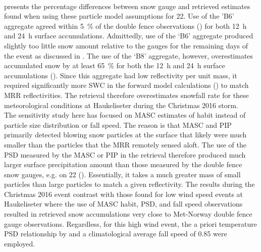 \\
 presents the percentage differences between snow gauge and retrieved estimates found when using these particle model assumptions for \SI{22}{\dec}. Use of the 'B6' aggregate agreed within \SI{5}{\percent} of the double fence observations () for both \SI{12}{\hour} and \SI{24}{\hour} surface accumulations. Admittedly, use of the ‘B6’ aggregate produced slightly too little snow amount relative to the gauges for the remaining days of the event as discussed in . The use of the ‘B8’ aggregate, however, overestimates accumulated snow by at least \SI{65}{\percent} for both the \SI{12}{\hour} and \SI{24}{\hour} surface accumulations (). Since this aggregate had low reflectivity per unit mass, it required significantly more SWC in the forward model calculations () to match MRR reflectivities. The retrieval therefore overestimates snowfall rate for these meteorological conditions at Haukeliseter during the Christmas 2016 storm.
\\
The sensitivity study here has focused on MASC estimates of habit instead of particle size distribution or fall speed. The reason is that MASC and PIP primarily detected blowing snow particles at the surface that likely were much smaller than the particles that the MRR remotely sensed aloft. The use of the PSD measured by the MASC or PIP in the retrieval therefore produced much larger surface precipitation amount than those measured by the double fence snow gauges, e.g. on \SI{22}{\dec} (). Essentially, it takes a much greater mass of small particles than large particles to match a given reflectivity. The results during the Christmas 2016 event contrast with those found for low wind speed events at Haukeliseter where the use of MASC habit, PSD, and fall speed observations resulted in retrieved snow accumulations very close to Met-Norway double fence gauge observations.  Regardless, for this high wind event, the a priori temperature PSD relationship by \citet{wood_estimation_2011} and a climatological average fall speed of \SI{0.85}{\mPs} \citep[personal communication,][]{Priv_Comm_Schirle} were employed.
\\
